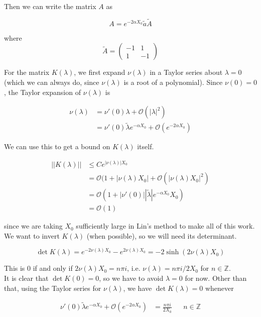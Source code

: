 \documentclass[12pt]{article}
\def\Z{{\mathbb Z}}
\begin{document}
Then we can write the matrix $A$ as 

\[
A = e^{-2\alpha X_0} \tilde{a} \tilde{A}
\]

where
\[
\tilde{A} = \begin{pmatrix}
-1 & 1 \\
1 & -1
\end{pmatrix}
\]

For the matrix $K(\lambda)$, we first expand $\nu(\lambda)$ in a Taylor series about $\lambda = 0$ (which we can always do, since $\nu(\lambda)$ is a root of a polynomial). Since $\nu(0) = 0$, the Taylor expansion of $\nu(\lambda)$ is 

\begin{align*}
\nu(\lambda) &= \nu'(0)\lambda + \mathcal{O}(|\lambda|^2) \\
&= \nu'(0)\tilde{\lambda}e^{-\alpha X_0} + \mathcal{O}(e^{-2 \alpha X_0})
\end{align*}

We can use this to get a bound on $K(\lambda)$ itself.

\begin{align*}
||K(\lambda)|| &\leq C e^{|\nu(\lambda)|X_0} \\
 &= \mathcal{O} (1 + |\nu(\lambda)X_0| + \mathcal{O}(|\nu(\lambda)X_0|^2) \\
&= \mathcal{O}( 1 + |\nu'(0)| |\tilde{\lambda} | e^{-\alpha X_0} X_0 ) \\
&= \mathcal{O}(1)
\end{align*}

since we are taking $X_0$ sufficiently large in Lin's method to make all of this work. We want to invert $K(\lambda)$ (when possible), so we will need its determinant.

\[
\det K(\lambda) = e^{-2 \nu(\lambda)X_0} - e^{2 \nu(\lambda)X_0} = -2 \sinh(2 \nu(\lambda) X_0)
\]

This is 0 if and only if $2 \nu(\lambda)X_0 = n \pi i$, i.e. $\nu(\lambda) = n \pi i / 2 X_0$ for $n \in \Z$. \\

It is clear that $\det K(0) = 0$, so we have to avoid $\lambda = 0$ for now. Other than that, using the Taylor series for $\nu(\lambda)$, we have $\det K(\lambda) = 0$ whenever

\begin{align*}
\nu'(0)\tilde{\lambda}e^{-\alpha X_0} + \mathcal{O}(e^{-2 \alpha X_0}) &= \frac{n \pi i }{2X_0} && n \in \Z \\
\end{align*}
\end{document}
